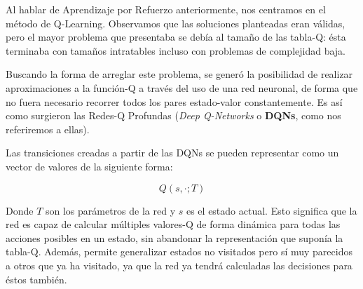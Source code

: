 Al hablar de Aprendizaje por Refuerzo anteriormente, nos centramos en el método de Q-Learning. Observamos que las soluciones planteadas eran válidas, pero el mayor problema que presentaba se debía al tamaño de las tabla-Q: ésta terminaba con tamaños intratables incluso con problemas de complejidad baja. 

Buscando la forma de arreglar este problema, se generó la posibilidad de realizar aproximaciones a la función-Q a través del uso de una red neuronal, de forma que no fuera necesario recorrer todos los pares estado-valor constantemente. Es así como surgieron las Redes-Q Profundas (\textit{Deep Q-Networks} o \textbf{DQNs}, como nos referiremos a ellas). 

Las transiciones creadas a partir de las DQNs se pueden representar como un vector de valores de la siguiente forma: 

$$Q(s, · ; T )$$ 

Donde $T$ son los parámetros de la red y $s$ es el estado actual. Esto significa que la red es capaz de calcular múltiples valores-Q de forma dinámica para todas las acciones posibles en un estado, sin abandonar la representación que suponía la tabla-Q. Además, permite generalizar estados no visitados pero sí muy parecidos a otros que ya ha visitado, ya que la red ya tendrá calculadas las decisiones para éstos también.
